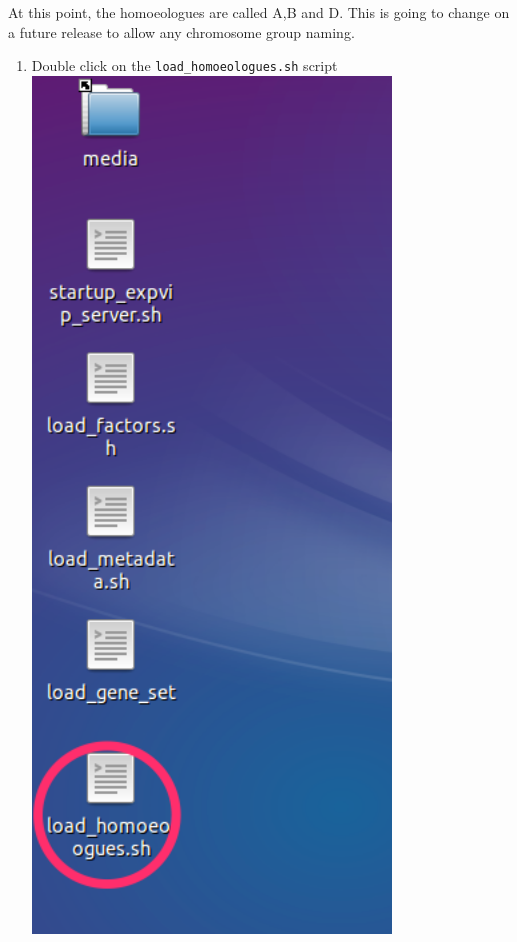 At this point, the homoeologues are called A,B and D. This is going to
change on a future release to allow any chromosome group naming.

\begin{enumerate}
\def\labelenumi{\arabic{enumi}.}
\itemsep1pt\parskip0pt
\item
  Double click on the \lstinline!load_homoeologues.sh! script
  \\ \includegraphics[width=0.75\textwidth]{expVIP/tutorial/images/LoadHom01.png}

\end{enumerate}
